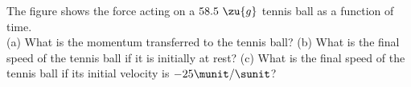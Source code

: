 The figure shows the force acting on a $58.5\ \zu{g}$ tennis ball
as a function of time.\\
%
(a) What is the momentum transferred to the tennis ball?\answercheck\hwendpart
%
(b) What is the final speed of the tennis ball if it is initially at
rest?\answercheck\hwendpart
%
(c) What is the final speed of the tennis ball if its initial
velocity is $-25 \munit/\sunit$?\answercheck
